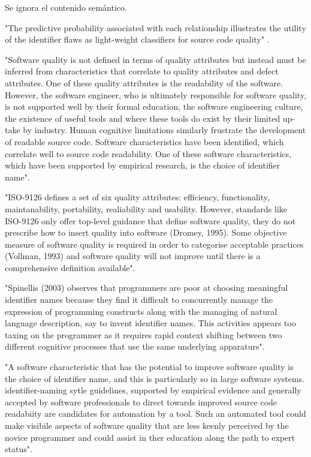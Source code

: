 Se ignora el contenido semántico.

"The predictive probability associated with each relationship illustrates the utility
of the identifier flaws as light-weight classifiers for source code quality"
\cite{ButlerWemelingerYu10}.

"Software quality is not defined in terms of quality attributes but instead must be
inferred from characteristics that correlate to quality attributes and defect attributes.
One of these quality attributes is the readability of the software.
However, the software engineer, who is ultimately responsible for software quality,
is not supported well by their formal education, the software engineering culture, the
existence of useful tools and where these tools do exist by their limited up-take by industry.
Human cognitive limitations similarly frustrate the development of readable source code.
Software characteristics have been identified, which correlate well to source code readability.
One of these software characteristics, which have been supported by empirical research,
is the choice of identifier name".\cite{Relf04}

"ISO-9126 defines a set of six quality attributes: efficiency, functionality, maintanability,
portability, realiability and usability.
However, standards like ISO-9126 only offer top-level guidance that define software quality,
they do not prescribe how to insert quality into software (Dromey, 1995).
Some objective measure of software quality is required in order to categorise acceptable
practices (Vollman, 1993) and software quality will not improve until there is a comprehensive
definition available"\cite{Relf04}.

"Spinellis (2003) observes that programmers are poor at choosing meaningful identifier names
because they find it difficult to concurrently manage the expression of programming constructs
along with the managing of natural language description, say to invent identifier names.
This activities appears too taxing on the programmer as it requires rapid context shifting
between two different cognitive processes that use the same underlying apparaturs"\cite{Relf04}.

"A software characteristic that has the potential to improve software quality is the choice of
identifier name, and this is particularly so in large software systems.
identifier-naming sytle guidelines, supported by empirical evidence and generally accepted by
software professionals to direct towards improved source code readabiity are candidates for
automation by a tool.
Such an automated tool could make visibile aspects of software quality that are less keenly
perceived by the novice programmer and could assist in ther education along the path to
expert status"\cite{Relf04}.


